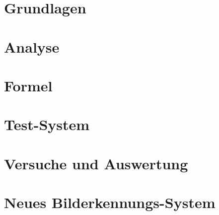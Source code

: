 






\frontmatter												%



\tableofcontents										%

\mainmatter													%



\chapter{Grundlagen}
\label{sec:Grundlagen}





\chapter{Analyse}
\label{sec:Analyse}

\chapter{Formel}
\label{sec:Formel}

\chapter{Test-System}
\label{sec:TestSystem}

\chapter{Versuche und Auswertung}
\label{sec:VersucheUndAuswertung}

\chapter{Neues Bilderkennungs-System}
\label{NeuesBilderkennungsSystem}

